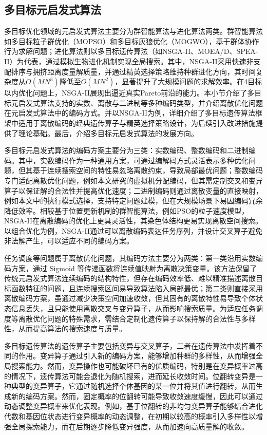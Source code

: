 \subsection{多目标元启发式算法}

多目标优化领域的元启发式算法主要分为群智能算法与进化算法两类。群智能算法如多目标粒子群优化（MOPSO）和多目标灰狼优化（MOGWO），基于群体协作行为求解问题；进化算法则以多目标遗传算法（如NSGA-II、MOEA/D、SPEA-II）为代表，通过模拟生物进化机制实现全局搜索。其中，NSGA-II\cite{debFastElitistMultiobjective2002}采用快速非支配排序与拥挤距离度量解质量，并通过精英选择策略维持种群进化方向，其时间复杂度从$O(MN^3)$降低至$O(MN^2)$，显著提升了大规模问题的求解效率。在4目标以内优化问题上，NSGA-II展现出逼近真实Pareto前沿的能力。本小节介绍了多目标元启发式算法支持的实数、离散与二进制等多种编码类型，并介绍离散优化问题在元启发式算法中的编码方式。并以NSGA-II为例，详细介绍了多目标遗传算法框架中适用于离散编码的经典遗传算子与精英选择策略设计，为后续引入改进措施提供了理论基础。最后，介绍多目标元启发式算法的发展方向。

多目标元启发式算法的编码方案主要分为三类：实数编码、整数编码和二进制编码。其中，实数编码作为一种通用方案，可通过编解码方式灵活表示多种优化问题，但其基于连续搜索空间的特性易忽略离散约束，导致局部最优问题\cite{abdel-bassetBinaryMetaheuristicAlgorithms2024}；整数编码专门适配离散优化问题，例如本文研究的虚拟机分配编码，但其需定制交叉和变异算子以保证解的合法性并提高优化速度；二进制编码则通过离散变量的直接映射，例如本文中的执行模式选择，支持特定问题建模，但在大规模场景下易因编码冗余降低效率。相较基于位置更新机制的群智能算法，例如PSO的粒子速度模型，NSGA-II在离散编码的优化上更具灵活性，其染色体结构更易实现离散空间搜索。以组合优化为例，NSGA-II通过可以离散编码表达任务序列，并设计交叉算子避免非法解产生，可以适应不同的编码方案。

任务调度等问题属于离散优化问题，其编码方法主要分为两类：第一类沿用实数编码方案，通过 Sigmoid 等传递函数将连续值映射为离散决策变量\cite{panSurveyBinaryMetaheuristic2023}。该方法保留了传统元启发式算法连续编码的结构特性，但存在编码效率低、难以精准描述离散目标函数特征的问题，且连续搜索区间易导致算法陷入局部最优；第二类则直接采用离散编码方案，虽通过减少决策空间加速收敛，但其固有的离散特性易导致个体状态信息丢失，且只能使用离散交叉与变异算子，从而影响搜索质量。为适应任务调度等离散优化问题的特殊需求，需结合定制化遗传算子以保持解的合法性与多样性，从而提高算法的搜索速度与质量。

多目标遗传算法的遗传算子主要包括变异与交叉算子，二者在遗传算法中发挥着不同的作用。变异算子通过引入新的编码方案，能够增加种群的多样性，从而增强全局搜索能力。然而，变异操作也可能破坏已有的优质编码，特别是在变异概率过高的情况下，遗传算法可能会退化为随机搜索，进而延长收敛时间。位翻转变异是一种典型的变异算子，它通过随机选择个体基因的某一位并将其值进行翻转，从而生成新的编码方案。然而，固定概率的位翻转可能导致收敛速度缓慢，因此可以通过动态调整变异概率来优化表现。例如，基于位翻转的非均匀变异算子能够结合进化代数和基因位状态进行变异概率的动态调整，在初期以较高的概率引入多样性以增强全局探索能力，而在后期逐步降低变异强度，从而加速向高质量解的收敛。


